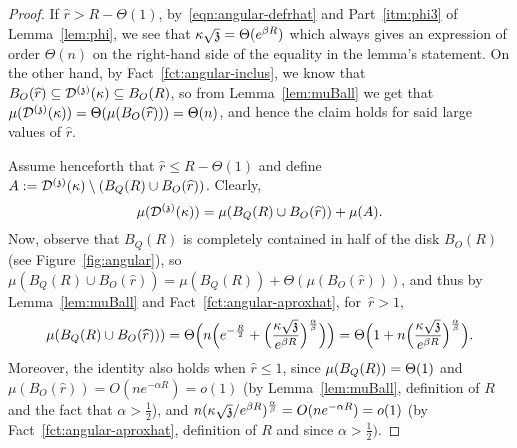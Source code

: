\begin{proof}
If $\widehat{r}> R-\Theta(1)$, by~\eqref{eqn:angular-defrhat} and Part~\eqref{itm:phi3} of Lemma~\ref{lem:phi}, we see that $\kappa\sqrt{\ss}=\Theta(e^{\beta R})$ which always gives an expression of order $\Theta(n)$ on the right-hand side of the equality in the lemma's statement. On the other hand, by Fact~\ref{fct:angular-inclus}, we know that $B_O(\widehat{r})\subseteq\dt(\kappa)\subseteq B_O(R)$, so
from Lemma~\ref{lem:muBall} we get that $\mu(\dt(\kappa))=\Theta(\mu(B_O(\widehat{r})))=\Theta(n)$, and hence 
the claim holds for said large values of $\widehat{r}$.

Assume henceforth that $\widehat{r} \leq R-\Theta(1)$ and define $A:=\dt(\kappa)\setminus (B_Q(R)\cup B_O(\widehat{r}))$.
Clearly, 
\begin{equation}\label{eqn:angular-muSum}
\mu(\dt(\kappa)) = \mu(B_Q(R)\cup B_O(\widehat{r}))+\mu(A).
\end{equation}
Now, observe that $B_Q(R)$ is completely contained in half of the disk $B_O(R)$ (see Figure~\ref{fig:angular}), so
$\mu(B_Q(R)\cup B_O(\widehat{r}))=\mu(B_Q(R))+\Theta(\mu(B_O(\widehat{r})))$, and thus by Lemma~\ref{lem:muBall} and Fact~\ref{fct:angular-aproxhat}, for~$\widehat{r}>1$, 
\begin{equation}\label{eqn:angular-muNotA}
\mu(B_Q(R)\cup B_O(\widehat{r})))=\Theta\Big(n\Big(e^{-\frac{R}{2}}+\Big(\frac{\kappa\sqrt{\ss}}{e^{\beta R}}\Big)^{\frac{\alpha}{\beta}}\Big)\Big)
=\Theta\Big(\mkor{\nu}{1}+n\Big(\frac{\kappa\sqrt{\ss}}{e^{\beta R}}\Big)^{\frac{\alpha}{\beta}}\Big).
\end{equation}
Moreover, the identity also holds when $\widehat{r}\leq 1$, since $\mu(B_Q(R))=\Theta(\mkor{\nu}{1})$ and $\mu(B_O(\widehat{r}))=O(ne^{-\alpha R})=o(1)$ (by Lemma~\ref{lem:muBall}, definition of $R$ and the fact that $\alpha>\frac12$), and $n(\kappa\sqrt{\ss}/e^{\beta R})^{\frac{\alpha}{\beta}}
=O(ne^{-\alpha R})=o(1)$ (by Fact~\ref{fct:angular-aproxhat}, definition of $R$ and since $\alpha>\frac12)$.



\end{proof}
